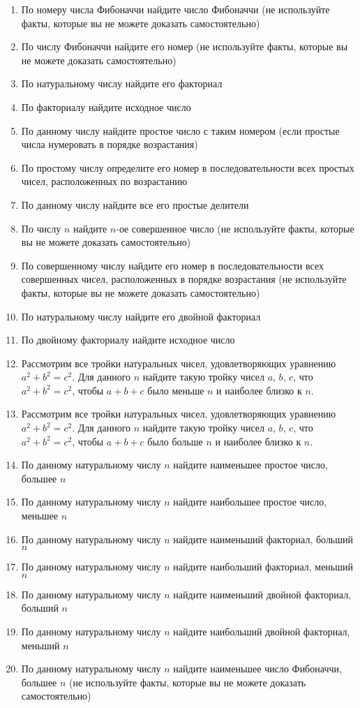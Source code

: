 \begin{enumerate}
	\item По номеру числа Фибоначчи найдите число Фибоначчи  (не используйте факты, которые вы не можете доказать самостоятельно)
	\item По числу Фибоначчи найдите его номер (не используйте факты, которые вы не можете доказать самостоятельно)
	\item По натуральному числу найдите его факториал
	\item По факториалу найдите исходное число
        \item По данному числу найдите простое число с таким номером (если простые числа нумеровать в порядке возрастания)
	\item По простому числу определите его номер в последовательности всех простых чисел, расположенных по возрастанию
	\item По данному числу найдите все его простые делители
	\item По числу $n$ найдите $n$-ое совершенное число (не используйте факты, которые вы не можете доказать самостоятельно)
	\item По совершенному числу найдите его номер в последовательности всех совершенных чисел, расположенных в порядке возрастания
                   (не используйте факты, которые вы не можете доказать самостоятельно)
	\item По натуральному числу найдите его двойной факториал
	\item По двойному факториалу найдите исходное число
	\item Рассмотрим все тройки натуральных чисел, удовлетворяющих уравнению $a^2+b^2=c^2$. Для данного $n$ найдите такую 
		тройку чисел $a$, $b$, $c$, что $a^2+b^2=c^2$, чтобы $a+b+c$ было меньше $n$ и наиболее близко к $n$.
	\item Рассмотрим все тройки натуральных чисел, удовлетворяющих уравнению $a^2+b^2=c^2$. Для данного $n$ найдите такую 
		тройку чисел $a$, $b$, $c$, что $a^2+b^2=c^2$, чтобы $a+b+c$ было больше $n$ и наиболее близко к $n$.
	\item По данному натуральному числу $n$ найдите наименьшее простое число, большее $n$
	\item По данному натуральному числу $n$ найдите наибольшее простое число, меньшее $n$
	\item По данному натуральному числу $n$ найдите наименьший факториал, больший $n$
	\item По данному натуральному числу $n$ найдите наибольший факториал, меньший $n$
	\item По данному натуральному числу $n$ найдите наименьший двойной факториал, больший $n$
	\item По данному натуральному числу $n$ найдите наибольший двойной факториал, меньший $n$
	\item По данному натуральному числу $n$ найдите наименьшее число Фибоначчи, большее $n$ (не используйте факты, которые вы не можете доказать самостоятельно)


\end{enumerate}
